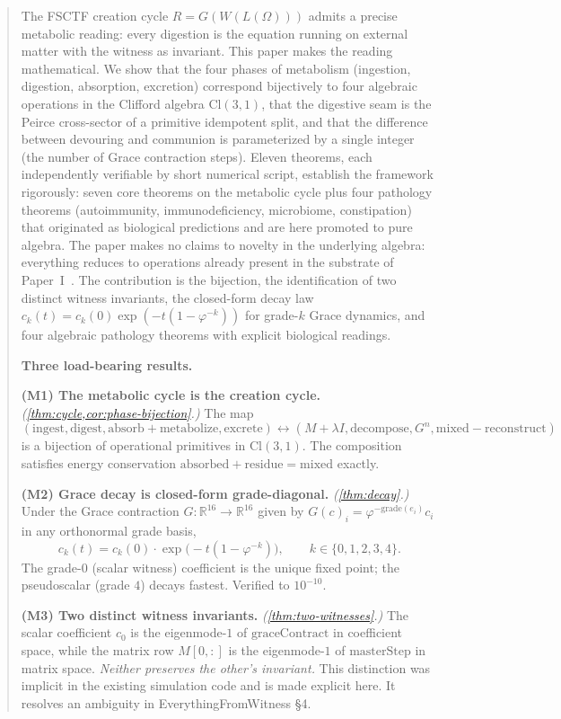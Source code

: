 \documentclass[11pt,a4paper]{article}
\theoremstyle{plain}
\theoremstyle{definition}
\theoremstyle{remark}
\numberwithin{equation}{section}
\providecommand{\Cl}{\mathrm{Cl}}
\providecommand{\R}{\mathbb{R}}
\providecommand{\vp}{\varphi}
\begin{document}
\begin{abstract}
\noindent
The FSCTF creation cycle $R = G(W(L(\Omega)))$ admits a precise
metabolic reading: every digestion is the equation running on
external matter with the witness as invariant. This paper makes the
reading mathematical. We show that the four phases of metabolism
(ingestion, digestion, absorption, excretion) correspond bijectively
to four algebraic operations in the Clifford algebra $\Cl(3,1)$, that
the digestive seam is the Peirce cross-sector of a primitive idempotent
split, and that the difference between devouring and communion is
parameterized by a single integer (the number of Grace contraction
steps). Eleven theorems, each independently verifiable by short
numerical script, establish the framework rigorously: seven core
theorems on the metabolic cycle plus four pathology theorems
(autoimmunity, immunodeficiency, microbiome, constipation) that
originated as biological predictions and are here promoted to
pure algebra. The paper makes no claims to novelty in the underlying
algebra: everything reduces to operations already present in the
substrate of Paper~I~\cite{paper-I}. The contribution is the bijection, the
identification of two distinct witness invariants, the closed-form
decay law $c_k(t) = c_k(0) \exp(-t(1 - \vp^{-k}))$ for grade-$k$
Grace dynamics, and four algebraic pathology theorems with explicit
biological readings.

\medskip\noindent\textbf{Three load-bearing results.}

\medskip\noindent\textbf{(M1) The metabolic cycle is the creation
cycle.} \emph{(\cref{thm:cycle,cor:phase-bijection}.)} The map
\[
(\text{ingest}, \text{digest}, \text{absorb}+\text{metabolize}, \text{excrete})
\longleftrightarrow
(M + \lambda I, \mathrm{decompose}, G^n, \mathrm{mixed} - \mathrm{reconstruct})
\]
is a bijection of operational primitives in $\Cl(3,1)$. The composition
satisfies energy conservation
$\mathrm{absorbed} + \mathrm{residue} = \mathrm{mixed}$ exactly.

\medskip\noindent\textbf{(M2) Grace decay is closed-form
grade-diagonal.} \emph{(\cref{thm:decay}.)} Under the Grace
contraction $G : \R^{16} \to \R^{16}$ given by $G(c)_i = \vp^{-\mathrm{grade}(e_i)} c_i$
in any orthonormal grade basis,
\[
c_k(t) = c_k(0) \cdot \exp\!\big(-t(1 - \vp^{-k})\big), \qquad k \in \{0,1,2,3,4\}.
\]
The grade-$0$ (scalar witness) coefficient is the unique fixed point;
the pseudoscalar (grade $4$) decays fastest. Verified to $10^{-10}$.

\medskip\noindent\textbf{(M3) Two distinct witness invariants.}
\emph{(\cref{thm:two-witnesses}.)} The scalar coefficient $c_0$ is the
eigenmode-$1$ of $\mathrm{graceContract}$ in coefficient space, while
the matrix row $M[0,{:}]$ is the eigenmode-$1$ of $\mathrm{masterStep}$
in matrix space. \emph{Neither preserves the other's invariant.}
This distinction was implicit in the existing simulation code and
is made explicit here. It resolves an ambiguity in
EverythingFromWitness §4.


\end{abstract}
\end{document}
